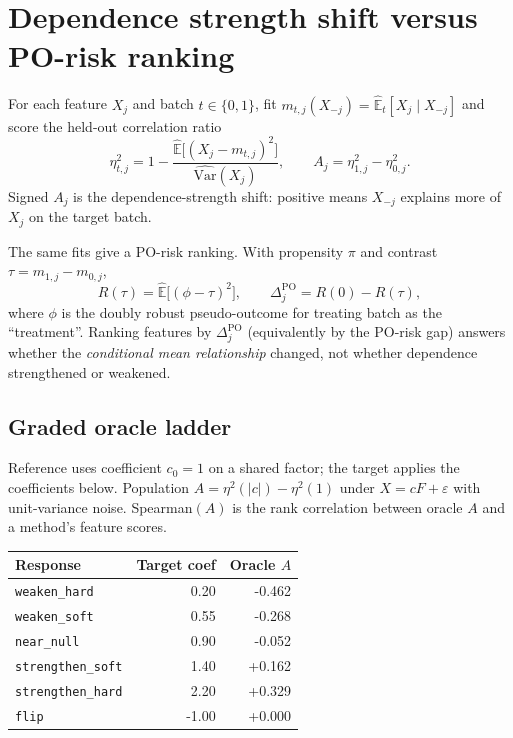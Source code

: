 \documentclass[11pt]{article}
\begin{document}
\section*{Dependence strength shift versus PO-risk ranking}

For each feature $X_j$ and batch $t\in\{0,1\}$, fit
$m_{t,j}(X_{-j})=\widehat{\mathbb{E}}_t[X_j\mid X_{-j}]$ and score the held-out correlation ratio
\begin{equation}
\eta^{2}_{t,j}=1-\frac{\widehat{\mathbb{E}}\bigl[(X_j-m_{t,j})^2\bigr]}{\widehat{\mathrm{Var}}(X_j)},
\qquad A_j=\eta^{2}_{1,j}-\eta^{2}_{0,j}.
\end{equation}
Signed $A_j$ is the dependence-strength shift: positive means $X_{-j}$ explains more of $X_j$ on the target batch.

The same fits give a PO-risk ranking. With propensity $\pi$ and contrast $\tau=m_{1,j}-m_{0,j}$,
\begin{equation}
R(\tau)=\widehat{\mathbb{E}}\bigl[(\phi-\tau)^2\bigr],
\qquad \Delta^{\mathrm{PO}}_j=R(0)-R(\tau),
\end{equation}
where $\phi$ is the doubly robust pseudo-outcome for treating batch as the ``treatment''.
Ranking features by $\Delta^{\mathrm{PO}}_j$ (equivalently by the PO-risk gap) answers whether the
\emph{conditional mean relationship} changed, not whether dependence strengthened or weakened.

\subsection*{Graded oracle ladder}

Reference uses coefficient $c_0=1$ on a shared factor; the target applies the coefficients below.
Population $A=\eta^{2}(|c|)-\eta^{2}(1)$ under $X=cF+\varepsilon$ with unit-variance noise.
Spearman$(A)$ is the rank correlation between oracle $A$ and a method's feature scores.

\begin{center}
\begin{tabular}{lrr}
\toprule
Response & Target coef & Oracle $A$ \\
\midrule
\texttt{weaken\_hard} & 0.20 & -0.462 \\
\texttt{weaken\_soft} & 0.55 & -0.268 \\
\texttt{near\_null} & 0.90 & -0.052 \\
\texttt{strengthen\_soft} & 1.40 & +0.162 \\
\texttt{strengthen\_hard} & 2.20 & +0.329 \\
\texttt{flip} & -1.00 & +0.000 \\
\bottomrule
\end{tabular}
\end{center}
\end{document}
